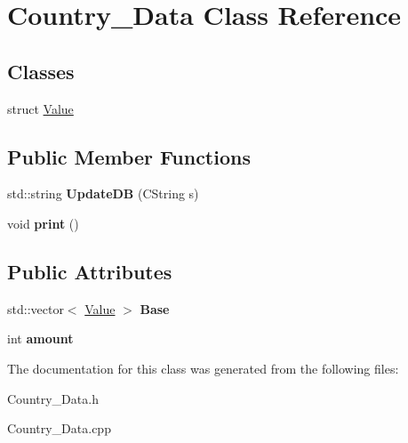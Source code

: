 \hypertarget{class_country___data}{}\section{Country\+\_\+\+Data Class Reference}
\label{class_country___data}
\subsection*{Classes}
\begin{DoxyCompactItemize}
\item 
struct \hyperlink{struct_country___data_1_1_value}{Value}
\end{DoxyCompactItemize}
\subsection*{Public Member Functions}
\begin{DoxyCompactItemize}
\item 
\hypertarget{class_country___data_ad8cd8e685a11d2c3e15586765f3e82b0}{}std\+::string {\bfseries Update\+D\+B} (C\+String s)\label{class_country___data_ad8cd8e685a11d2c3e15586765f3e82b0}

\item 
\hypertarget{class_country___data_aeb6c9e9291cf5330e8a34b57834db549}{}void {\bfseries print} ()\label{class_country___data_aeb6c9e9291cf5330e8a34b57834db549}

\end{DoxyCompactItemize}
\subsection*{Public Attributes}
\begin{DoxyCompactItemize}
\item 
\hypertarget{class_country___data_a84a1f119a29d9cc565f97f209cf73c03}{}std\+::vector$<$ \hyperlink{struct_country___data_1_1_value}{Value} $>$ {\bfseries Base}\label{class_country___data_a84a1f119a29d9cc565f97f209cf73c03}

\item 
\hypertarget{class_country___data_a2d51faac28584061816d53dfbbeabb55}{}int {\bfseries amount}\label{class_country___data_a2d51faac28584061816d53dfbbeabb55}

\end{DoxyCompactItemize}


The documentation for this class was generated from the following files\+:\begin{DoxyCompactItemize}
\item 
Country\+\_\+\+Data.\+h\item 
Country\+\_\+\+Data.\+cpp\end{DoxyCompactItemize}
